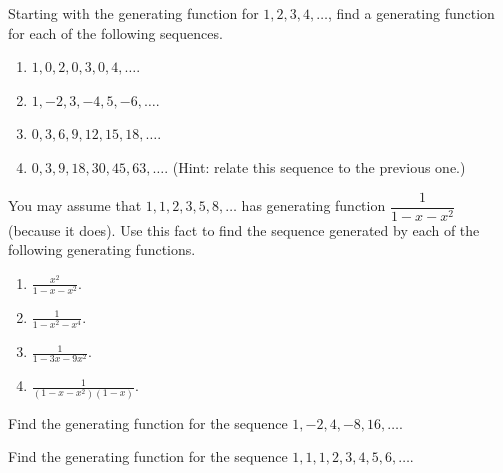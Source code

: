 \documentclass[10pt,]{book}
\theoremstyle{plain}
\theoremstyle{definition}
\theoremstyle{definition}
\theoremstyle{definition}
\theoremstyle{definition}
\numberwithin{equation}{chapter}
\begin{document}
\begin{divisionexercise}{12}\hypertarget{exercise-95}{}
\hypertarget{p-1148}{}%
Starting with the generating function for \(1,2,3,4, \ldots\), find a generating function for each of the following sequences.%
\par
\hypertarget{p-1149}{}%
\leavevmode%
\begin{enumerate}[label=(\alph*)]
\item\hypertarget{li-190}{}\(1, 0, 2, 0, 3, 0, 4,\ldots\).%
\item\hypertarget{li-191}{}\(1, -2, 3, -4, 5, -6, \ldots\).%
\item\hypertarget{li-192}{}\(0, 3, 6, 9, 12, 15, 18, \ldots\).%
\item\hypertarget{li-193}{}\(0, 3, 9, 18, 30, 45, 63,\ldots\). (Hint: relate this sequence to the previous one.)%
\end{enumerate}
%
\end{divisionexercise}%
\begin{divisionexercise}{13}\hypertarget{exercise-96}{}
\hypertarget{p-1151}{}%
You may assume that \(1, 1, 2, 3, 5, 8,\ldots\) has generating function \(\dfrac{1}{1-x-x^2}\) (because it does). Use this fact to find the sequence generated by each of the following generating functions.%
\par
\hypertarget{p-1152}{}%
\leavevmode%
\begin{enumerate}[label=(\alph*)]
\item\hypertarget{li-198}{}\(\frac{x^2}{1-x-x^2}\).%
\item\hypertarget{li-199}{}\(\frac{1}{1-x^2-x^4}\).%
\item\hypertarget{li-200}{}\(\frac{1}{1-3x-9x^2}\).%
\item\hypertarget{li-201}{}\(\frac{1}{(1-x-x^2)(1-x)}\).%
\end{enumerate}
%
\end{divisionexercise}%
\begin{divisionexercise}{14}\hypertarget{exercise-97}{}
\hypertarget{p-1154}{}%
Find the generating function for the sequence \(1, -2, 4, -8, 16, \ldots\).%
\end{divisionexercise}%
\begin{divisionexercise}{15}\hypertarget{exercise-98}{}
\hypertarget{p-1156}{}%
Find the generating function for the sequence \(1, 1, 1, 2, 3, 4, 5, 6, \ldots\).%
\end{divisionexercise}%
\end{document}
